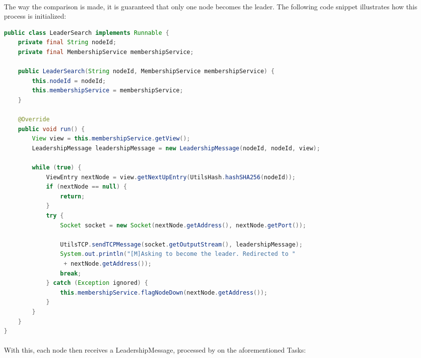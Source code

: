 \documentclass{report}
\begin{document}
	        	\paragraph{}The way the comparison is made, it is guaranteed that only one node becomes the leader. The following code snippet illustrates how this process is initialized:
	        	
	        	\vspace{.5cm}	        	
	        	\begin{adjustbox}{center}
	        	\begin{lstlisting}[language=java]
public class LeaderSearch implements Runnable {
	private final String nodeId;
	private final MembershipService membershipService;
	
	public LeaderSearch(String nodeId, MembershipService membershipService) {
		this.nodeId = nodeId;
		this.membershipService = membershipService;
	}
	
	@Override
	public void run() {
		View view = this.membershipService.getView();
		LeadershipMessage leadershipMessage = new LeadershipMessage(nodeId, nodeId, view);
		
		while (true) {
			ViewEntry nextNode = view.getNextUpEntry(UtilsHash.hashSHA256(nodeId));
			if (nextNode == null) {
				return;
			}
			try {
				Socket socket = new Socket(nextNode.getAddress(), nextNode.getPort());
				
				UtilsTCP.sendTCPMessage(socket.getOutputStream(), leadershipMessage);
				System.out.println("[M]Asking to become the leader. Redirected to "
				 + nextNode.getAddress());
				break;
			} catch (Exception ignored) {
				this.membershipService.flagNodeDown(nextNode.getAddress());
			}
		}
	}
}

	        	\end{lstlisting}
        	\end{adjustbox}
        
        	\paragraph{}With this, each node then receives a LeadershipMessage, processed by on the aforementioned Tasks:
        	
\end{document}
